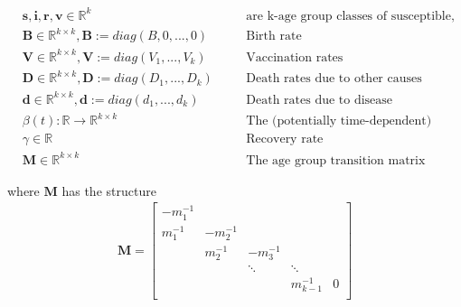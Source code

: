 \documentclass{article}
\begin{document}
\begin{align*}
&\mathbf{s}, \mathbf{i}, \mathbf{r} ,\mathbf{v}\in \mathbb{R}^k& \quad& \text{are k-age group classes of susceptible, infected, recovered}\\
&\mathbf{B} \in \mathbb{R}^{k\times k}, \mathbf{B}:=diag(B,0,...,0)& \quad& \text{Birth rate}\\
&\mathbf{V} \in \mathbb{R}^{k\times k}, \mathbf{V}:=diag(V_1,...,V_k) &\quad& \text{Vaccination rates}\\
&\mathbf{D} \in \mathbb{R}^{k\times k}, \mathbf{D}:=diag(D_1,...,D_k) &\quad& \text{Death rates due to other causes}\\
&\mathbf{d} \in \mathbb{R}^{k\times k}, \mathbf{d}:=diag(d_1,...,d_k) &\quad& \text{Death rates due to disease}\\
&\beta(t):\mathbb{R} \rightarrow \mathbb{R}^{k\times k}&\quad& \text{The (potentially time-dependent) contact rate}\\
&\gamma \in \mathbb{R}&\quad&\text{Recovery rate}\\
&\mathbf{M}\in\mathbb{R}^{k\times k}&\quad& \text{The age group transition matrix}
\end{align*}

  where $\mathbf{M}$ has the structure
\begin{gather*}
\mathbf{M}=\begin{bmatrix}
-m_1^{-1} &      &        &        &    \\
 m_1^{-1} & -m_2^{-1} &        &        &    \\
     &  m_2^{-1} & -m_3^{-1}   &        &    \\
     &      & \ddots & \ddots &    \\
     &      &		 & m_{k-1}^{-1}& 0\\
\end{bmatrix}
\end{gather*}
\end{document}
